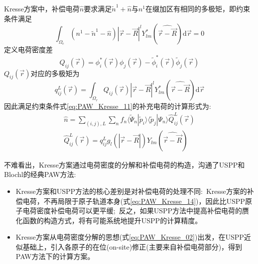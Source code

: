 \textrm{Kresse}方案中，补偿电荷$\hat n$要求满足$\tilde n^1+\hat n$与$n^1$在缀加区有相同的多极矩，即约束条件满足 
\begin{equation}
	\int_{\Omega_c}(n^1-\tilde n^1-\hat n)|\vec r-\vec R|^lY_{lm}^{\ast}(\widehat{\vec r-\vec R})\mathrm{d}\vec r=0
	\label{eq:PAW_Kresse_11}
\end{equation}
定义电荷密度差
\begin{equation}
	Q_{ij}(\vec r)=\phi_i^{\ast}(\vec r)\phi_j(\vec r)-\tilde\phi_i^{\ast}(\vec r)\tilde\phi_j(\vec r)
	\label{eq:PAW_Kresse_12}
\end{equation}
$Q_{ij}(\vec r)$对应的多极矩为
\begin{equation}
	q_{ij}^L(\vec r)=\int_{\Omega_r}Q_{ij}(\vec r)|\vec r-\vec R|^lY_{lm}^{\ast}(\widehat{\vec r-\vec R})\mathrm{d}\vec r
	\label{eq:PAW_Kresse_13}
\end{equation}
因此满足约束条件式\eqref{eq:PAW_Kresse_11}的补充电荷的计算形式为:~
\begin{equation}
	\begin{aligned}
		\hat n=\sum_{(i,j),L}\sum_n f_n\langle\tilde\Psi_n|\tilde p_i\rangle\langle\tilde p_j|\Psi_n\rangle\hat Q_{ij}^L(\vec r)\\
		\hat Q_{ij}^L(\vec r)=q_{ij}^Lg_l(|\vec r-\vec R|)Y_{lm}(\widehat{\vec r-\vec R})
	\end{aligned}
	\label{eq:PAW_Kresse_14}
\end{equation}

不难看出，\textrm{Kresse}方案通过电荷密度的分解和补偿电荷的构造，沟通了\textrm{USPP}和\textrm{Blochl}的经典\textrm{PAW}方法:
\begin{itemize}
	\item \textrm{Kresse}方案和\textrm{USPP}方法的核心差别是对补偿电荷的处理不同:~\textrm{Kresse}方案的补偿电荷，不再局限于原子轨道本身(式\eqref{eq:PAW_Kresse_14})，因此比\textrm{USPP}原子电荷密度补偿电荷可以更平缓;~反之，如果\textrm{USPP}方法中提高补偿电荷的赝化函数的构造方式，将有可能系统地提升\textrm{USPP}的计算精度。
	\item \textrm{Kresse}方案从电荷密度分解的思想(式\eqref{eq:PAW_Kresse_02})出发，在\textrm{USPP}近似基础上，引入各原子的在位(\textrm{on-site})修正(主要来自补偿电荷部分)，得到\textrm{PAW}方法下的计算方案。
\end{itemize}


